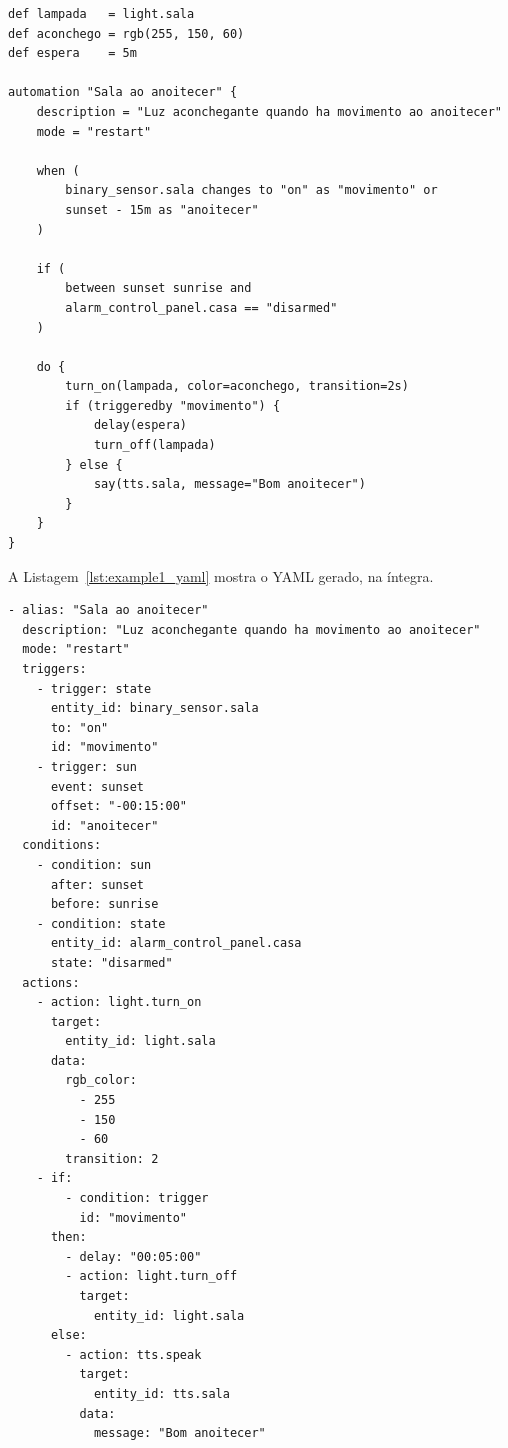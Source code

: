 \documentclass[12pt]{article}
\begin{document}
\begin{listing}[H]
    \centering
    \begin{verbatim}
def lampada   = light.sala
def aconchego = rgb(255, 150, 60)
def espera    = 5m

automation "Sala ao anoitecer" {
    description = "Luz aconchegante quando ha movimento ao anoitecer"
    mode = "restart"

    when (
        binary_sensor.sala changes to "on" as "movimento" or
        sunset - 15m as "anoitecer"
    )

    if (
        between sunset sunrise and
        alarm_control_panel.casa == "disarmed"
    )

    do {
        turn_on(lampada, color=aconchego, transition=2s)
        if (triggeredby "movimento") {
            delay(espera)
            turn_off(lampada)
        } else {
            say(tts.sala, message="Bom anoitecer")
        }
    }
}
    \end{verbatim}
    \caption{Fonte do exemplo detalhado.}
    \label{lst:example1_src}
\end{listing}

A Listagem~\ref{lst:example1_yaml} mostra o YAML gerado, na íntegra.

\begin{listing}[H]
    \centering
    \begin{verbatim}
- alias: "Sala ao anoitecer"
  description: "Luz aconchegante quando ha movimento ao anoitecer"
  mode: "restart"
  triggers:
    - trigger: state
      entity_id: binary_sensor.sala
      to: "on"
      id: "movimento"
    - trigger: sun
      event: sunset
      offset: "-00:15:00"
      id: "anoitecer"
  conditions:
    - condition: sun
      after: sunset
      before: sunrise
    - condition: state
      entity_id: alarm_control_panel.casa
      state: "disarmed"
  actions:
    - action: light.turn_on
      target:
        entity_id: light.sala
      data:
        rgb_color:
          - 255
          - 150
          - 60
        transition: 2
    - if:
        - condition: trigger
          id: "movimento"
      then:
        - delay: "00:05:00"
        - action: light.turn_off
          target:
            entity_id: light.sala
      else:
        - action: tts.speak
          target:
            entity_id: tts.sala
          data:
            message: "Bom anoitecer"
    \end{verbatim}
    \caption{Saída completa para a Listagem~\ref{lst:example1_src}.}
    \label{lst:example1_yaml}
\end{listing}
\end{document}
